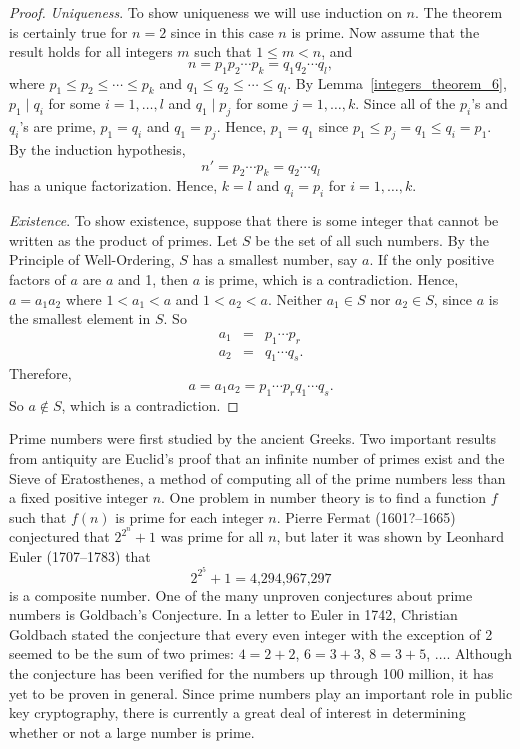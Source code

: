 \begin{proof}
{\em Uniqueness}.
To show uniqueness we will use induction on $n$. The theorem is certainly true for $n = 2$ since in this case $n$ is prime.  Now assume that the result holds for all integers $m$ such that $1 \leq m < n$, and 
$$
n = p_1 p_2 \cdots p_k = q_1 q_2 \cdots q_l,
$$
where $p_1 \leq p_2 \leq \cdots \leq p_k$ and $q_1 \leq q_2 \leq \cdots \leq q_l$. By Lemma~\ref{integers_theorem_6}, $p_1  \mid  q_i$ for some $i = 1, \ldots, l$ and $q_1  \mid  p_j$ for some $j = 1, \ldots, k$.  Since all of the $p_i$'s and $q_i$'s are prime, $p_1 = q_i$ and  $q_1 = p_j$. Hence, $p_1 = q_1$ since $p_1 \leq p_j = q_1 \leq q_i = p_1$.  By the induction hypothesis, 
$$
n' = p_2 \cdots p_k = q_2 \cdots q_l
$$
has a unique factorization.  Hence, $k=l$ and $q_i = p_i$ for $i = 1, \ldots, k$. 

{\em Existence}.
To show existence, suppose that there is some integer that cannot be written as the product of primes.  Let $S$ be the set of all such numbers.  By the Principle of Well-Ordering, $S$ has a smallest number, say $a$.  If the only positive factors of $a$ are $a$ and 1, then $a$ is prime, which is a contradiction.  Hence, $a = a_1 a_2$ where $1 < a_1 < a$ and $1 < a_2 < a$.  Neither $a_1\in S$ nor $a_2 \in S$, since $a$ is the smallest element in $S$.  So 
\begin{eqnarray*}
a_1 & = & p_1 \cdots p_r \\
a_2 & = & q_1 \cdots q_s.
\end{eqnarray*}
Therefore,
$$
a = a_1 a_2 = p_1 \cdots p_r q_1 \cdots q_s.
$$
So $a \notin S$, which is a contradiction.
\end{proof}
 
\histhead

\noindent
\parbox{\textwidth}
{\small \histf
Prime numbers were first studied by the ancient Greeks.  Two important results from antiquity are Euclid's proof that an infinite number of primes exist and the Sieve of Eratosthenes, a method of computing all of the prime numbers less than a fixed positive integer $n$.  One problem in number theory is to find a function $f$ such that $f(n)$ is prime for each integer $n$. Pierre Fermat (1601?--1665) conjectured that $2^{2^n} + 1$ was prime for all $n$, but later it was shown by Leonhard Euler (1707--1783) that 
$$
2^{2^5} + 1 = \mbox{4,294,967,297}
$$
is a composite number. One of the many unproven conjectures about prime numbers is Goldbach's Conjecture.  In a letter to Euler in 1742, Christian Goldbach stated the conjecture that every even integer with the exception of 2 seemed to be the sum of two primes:  $4 = 2 + 2$, $6 = 3 + 3$, $8 =3 + 5$, $\ldots$.  Although the conjecture has been verified for the numbers up through 100 million, it has yet to be proven in general.  Since prime numbers play an important role in public key cryptography, there is currently a great deal of interest in determining whether or not a large number is prime.
\histbox
}


